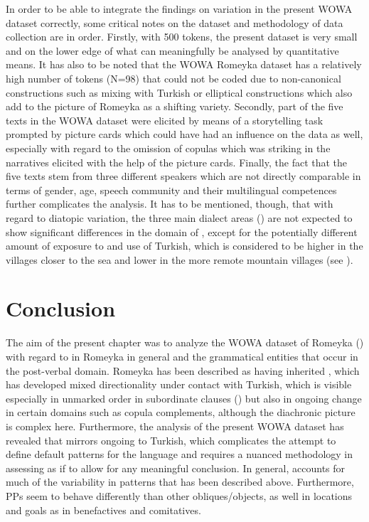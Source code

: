 \documentclass[output=paper,colorlinks,citecolor=brown]{langscibook}
\begin{document}
In order to be able to integrate the findings on  variation in the present WOWA dataset correctly, some critical notes on the dataset and methodology of data collection are in order. Firstly, with 500 tokens, the present dataset is very small and on the lower edge of what can meaningfully be analysed by quantitative means. It has also to be noted that the WOWA Romeyka dataset has a relatively high number of tokens (N=98) that could not be coded due to non-canonical constructions such as mixing with Turkish or elliptical constructions which also add to the picture of Romeyka as a shifting variety. Secondly, part of the five texts in the WOWA dataset were elicited by means of a storytelling task prompted by picture cards which could have had an influence on the data as well, especially with regard to the omission of copulas which was striking in the narratives elicited with the help of the picture cards. Finally, the fact that the five texts stem from three different speakers which are not directly comparable in terms of gender, age, speech community and their multilingual competences further complicates the analysis. It has to be mentioned, though, that with regard to diatopic variation, the three main dialect areas (\citealt{schreiberRomeyka2018}) are not expected to show significant differences in the domain of , except for the potentially different amount of exposure to and use of Turkish, which is considered to be higher in the villages closer to the sea and lower in the more remote mountain villages (see \citealt{schreiberRomeyka2018}).

\section{Conclusion}\label{Romeyka:ss:7}

The aim of the present chapter was to analyze the WOWA dataset of Romeyka (\citealt{schreiber2021pontic}) with regard to  in Romeyka in general and the grammatical entities that occur in the post-verbal domain. Romeyka has been described as having inherited  , which has developed mixed directionality under contact with Turkish, which is visible especially in unmarked  order in subordinate clauses (\citealt{neocleous_word_2020,neocleousEvolution2022}) but also in ongoing change in certain domains such as copula complements, although the diachronic picture is complex here. Furthermore, the analysis of the present WOWA dataset has revealed that  mirrors ongoing  to Turkish, which complicates the attempt to define default  patterns for the language and requires a nuanced methodology in assessing  as if to allow for any meaningful conclusion. In general,  accounts for much of the variability in  patterns that has been described above. Furthermore, PPs seem to behave differently than other obliques/objects, as well in locations and goals as in benefactives and comitatives.
\end{document}
